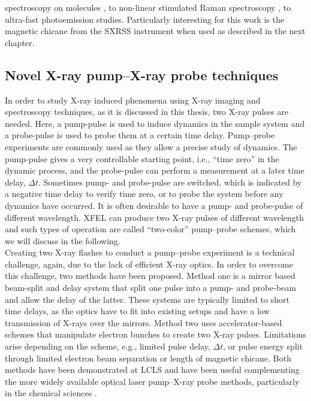 spectroscopy on molecules \citep{Bucher-2014-Unpublished}, to non-linear stimulated Raman spectroscopy \citep{Kimberg-2016-FD}, to ultra-fast photoemission studies. Particularly interesting for this work is the magnetic chicane from the SXRSS instrument when used as described in the next chapter.
%
%
%
%
\subsection{Novel X-ray pump–X-ray probe techniques}\label{sec:novel-pump--probe-tech}
In order to study X-ray induced phenomena using X-ray imaging and spectroscopy techniques, as it is discussed in this thesis, two X-ray pulses are needed. Here, a pump-pulse is used to induce dynamics in the sample system and a probe-pulse is used to probe them at a certain time delay. Pump--probe experiments are commonly used as they allow a precise study of dynamics. The pump-pulse gives a very controllable starting point, i.e., ``time zero'' in the dynamic process, and the probe-pulse can perform a measurement at a later time delay, $\Delta t$. Sometimes pump- and probe-pulse are switched, which is indicated by a negative time delay to verify time zero, or to probe the system before any dynamics have occurred. It is often desirable to have a pump- and probe-pulse of different wavelength. XFEL can produce two X-ray pulses of different wavelength and such types of operation are called ``two-color'' pump--probe schemes, which we will discuss in the following.\\[1\baselineskip]
%
Creating two X-ray flashes to conduct a pump--probe experiment is a technical challenge, again, due to the lack of efficient X-ray optics. In order to overcome this challenge, two methods have been proposed. Method one is a mirror based beam-split and delay system \citep{Castagna-2013-JPCS,Murphy-2012-SPIE} that split one pulse into a pump- and probe-beam and allow the delay of the latter. These systems are typically limited to short time delays, as the optics have to fit into existing setups and have a low transmission of X-rays over the mirrors. Method two uses accelerator-based schemes \citep{Lutman-2013-PRL,Marinelli-2015-NatComm} that manipulate electron bunches to create two X-ray pulses. Limitations arise depending on the scheme, e.g., limited pulse delay, $\Delta t$, or pulse energy split through limited electron beam separation or length of magnetic chicane. Both methods have been demonstrated at LCLS and have been useful complementing the more widely available optical laser pump--X-ray probe methods, particularly in the chemical sciences \cite{Picon-2016-NatComm,Ferguson-2016-SciAdv,Liekhus-Schmaltz-2015-NatComm}.\\[1\baselineskip]
